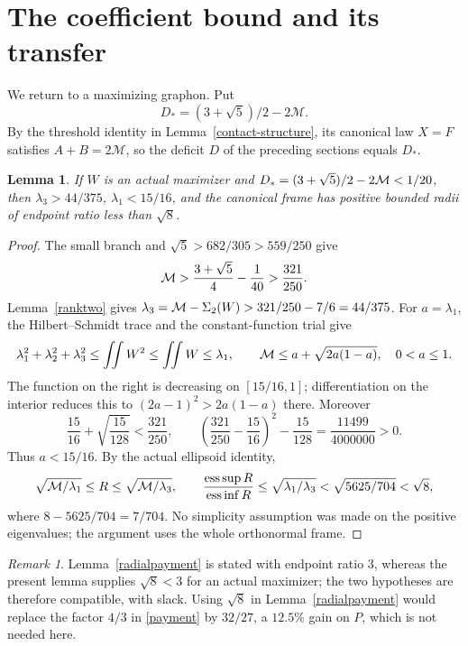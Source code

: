 \documentclass[11pt]{article}
\newtheorem{lemma}[theorem]{Lemma}
\theoremstyle{remark}\newtheorem{remark}[theorem]{Remark}
\DeclareMathOperator{\esssup}{ess\,sup}
\DeclareMathOperator{\essinf}{ess\,inf}
\numberwithin{equation}{section}
\begin{document}
\section{The coefficient bound and its transfer}\label{sec-conclusion}
We return to a maximizing graphon. Put
\[
 D_*=(3+\sqrt5)/2-2\mathcal M.
\]
By the threshold identity in Lemma~\ref{contact-structure}, its canonical
law $X=F$ satisfies $A+B=2\mathcal M$, so the deficit $D$ of the preceding
sections equals $D_*$.
\begin{lemma}\label{spectral-reserve}
If $W$ is an actual maximizer and $D_*=(3+\sqrt5)/2-2{\cal M}<1/20$,
then $\lambda_3>44/375$, $\lambda_1<15/16$, and the canonical frame
has positive bounded radii of endpoint ratio less than $\sqrt8$.
\end{lemma}
\begin{proof}
The small branch and $\sqrt5>682/305>559/250$ give
\[
 {\cal M}>\frac{3+\sqrt5}{4}-\frac1{40}>\frac{321}{250}.
\]
Lemma~\ref{ranktwo} gives
$\lambda_3={\cal M}-\Sigma_2(W)>321/250-7/6=44/375$.
For $a=\lambda_1$, the Hilbert--Schmidt trace and the constant-function trial give
\[
 \lambda_1^2+\lambda_2^2+\lambda_3^2\le\iint W^2\le\iint W\le\lambda_1,
 \qquad {\cal M}\le a+\sqrt{2a(1-a)},\quad 0<a\le1.
\]
The function on the right is decreasing on $[15/16,1]$; differentiation
on the interior reduces this to $(2a-1)^2>2a(1-a)$ there.
Moreover
\[
 \frac{15}{16}+\sqrt{\frac{15}{128}}<\frac{321}{250},\qquad
 \left(\frac{321}{250}-\frac{15}{16}\right)^2-\frac{15}{128}
       =\frac{11499}{4000000}>0.
\]
Thus $a<15/16$. By the actual ellipsoid identity,
\[
 \sqrt{{\cal M}/\lambda_1}\le R\le\sqrt{{\cal M}/\lambda_3},\qquad
 \frac{\esssup R}{\essinf R}
 \le\sqrt{\lambda_1/\lambda_3}<\sqrt{5625/704}<\sqrt8,
\]
where $8-5625/704=7/704$. No simplicity assumption was made on
the positive eigenvalues; the argument uses the whole orthonormal frame.
\end{proof}

\begin{remark}\label{rem-radii}
Lemma~\ref{radialpayment} is stated with endpoint ratio $3$, whereas the
present lemma supplies $\sqrt8<3$ for an actual maximizer; the two
hypotheses are therefore compatible, with slack. Using $\sqrt8$ in
Lemma~\ref{radialpayment} would replace the factor $4/3$ in \eqref{payment}
by $32/27$, a $12.5\%$ gain on $P$, which is not needed here.
\end{remark}
\end{document}
